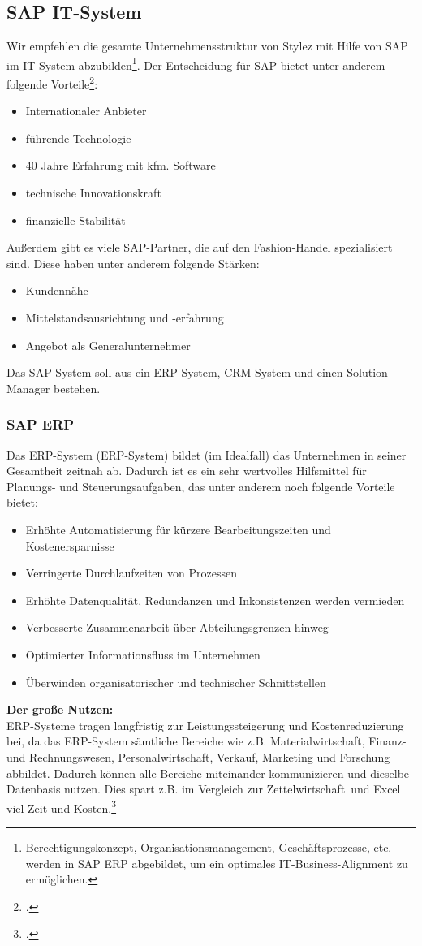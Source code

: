 \subsection{SAP IT-System}
Wir empfehlen die gesamte Unternehmensstruktur von Stylez mit Hilfe von SAP im IT-System abzubilden\footnote{Berechtigungskonzept, Organisationsmanagement, Geschäftsprozesse, etc. werden in SAP ERP abgebildet, um ein optimales IT-Business-Alignment zu ermöglichen.}. Der Entscheidung für SAP bietet unter anderem folgende Vorteile\footcite[Online im Internet.]{SAP_Vorteil}:
\begin{itemize}
\item Internationaler Anbieter
\item führende Technologie
\item 40 Jahre Erfahrung mit kfm. Software
\item technische Innovationskraft
\item finanzielle Stabilität
\end{itemize}
Außerdem gibt es viele SAP-Partner, die auf den Fashion-Handel spezialisiert sind. Diese haben unter anderem folgende Stärken:
\begin{itemize}
\item Kundennähe
\item Mittelstandsausrichtung und -erfahrung
\item Angebot als Generalunternehmer
\end{itemize}
Das SAP System soll aus ein \acrshort{ERP}-System, \acrshort{CRM}-System und einen Solution Manager bestehen.
\subsubsection{SAP ERP}
Das \acrlong{ERP}-System (ERP-System) bildet (im Idealfall) das Unternehmen in seiner Gesamtheit zeitnah ab. Dadurch ist es ein sehr wertvolles Hilfsmittel für Planungs- und Steuerungsaufgaben, das unter anderem noch folgende Vorteile bietet:
\begin{itemize}
\item Erhöhte Automatisierung für kürzere Bearbeitungszeiten und Kostenersparnisse
\item Verringerte Durchlaufzeiten von Prozessen
\item Erhöhte Datenqualität, Redundanzen und Inkonsistenzen werden vermieden
\item Verbesserte Zusammenarbeit über Abteilungsgrenzen hinweg
\item Optimierter Informationsfluss im Unternehmen
\item Überwinden organisatorischer und technischer Schnittstellen
\end{itemize}
\underline{\textbf{Der große Nutzen:}}\\
ERP-Systeme tragen langfristig zur Leistungssteigerung und Kostenreduzierung bei, da das ERP-System sämtliche Bereiche wie z.B. Materialwirtschaft, Finanz- und Rechnungswesen, Personalwirtschaft, Verkauf, Marketing und Forschung abbildet. Dadurch können alle Bereiche miteinander kommunizieren und dieselbe Datenbasis nutzen. Dies spart z.B. im Vergleich zur \glqq Zettelwirtschaft\grqq~und Excel viel Zeit und Kosten.\footcite[vgl.][Online im Internet.]{ERP}
